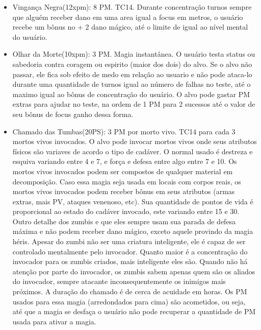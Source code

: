 \begin{itemize}
	\item Vingança Negra(12xpm): 8 PM. TC14. \newline
Durante concentração turnos sempre que alguém receber dano em uma area igual a focus em metros, o usuário recebe um bônus no + 2 dano mágico, até o limite de igual ao nível mental do usuário.

	\item Olhar da Morte(10xpm): 3 PM. Magia instantânea.\newline
O usuário testa status ou sabedoria contra coragem ou espirito (maior dos dois) do alvo. Se o alvo não passar, ele fica sob efeito de medo em relação ao usuario e não pode ataca-lo durante uma quantidade de turnos igual ao número de falhas no teste, até o maximo igual ao bônus de concentração do usuário. O alvo pode gastar PM extras para ajudar no teste, na ordem de 1 PM para 2 sucessos até o valor de seu bônus de focus ganho dessa forma.
  
	\item Chamado das Tumbas(20PS): 3 PM por morto vivo. TC14 para cada 3 mortos vivos invocados.\newline
O alvo pode invocar mortos vivos onde seus atributos físicos são variaves de acordo o tipo de cadáver. O normal usado é destreza e esquiva variando entre 4 e 7, e força e defesa entre algo entre 7 e 10. Os mortos vivos invocados podem ser compostos de qualquer material em decomposição. Caso essa magia seja usada em locais com corpos reais, os mortos vivos invocados podem receber bônus em seus atributos (armas extras, mais PV, ataques venenoso, etc). Sua quantidade de pontos de vida é proporcional ao estado do cadáver invocado, este variando entre 15 e 30. Outro detalhe dos zumbis e que eles sempre usam sua parada de defesa máxima e não podem receber dano mágico, exceto aquele provindo da magia héris. Apesar do zumbi não ser uma criatura inteligente, ele é capaz de ser controlado mentalmente pelo invocador. Quanto maior é a concentração do invocador para os zumbis criados, mais inteligente eles são. Quando não há atenção por parte do invocador, os zumbis sabem apenas quem são os aliados do invocador, sempre atacante inconsequentemente os inimigos mais próximos. A duração do chamado é de cerca de acuidade em horas. Os PM usados para essa magia (arredondados para cima) são acometidos, ou seja, até que a magia se desfaça o usuário não pode recuperar a quantidade de PM usada para ativar a magia.



\end{itemize}

